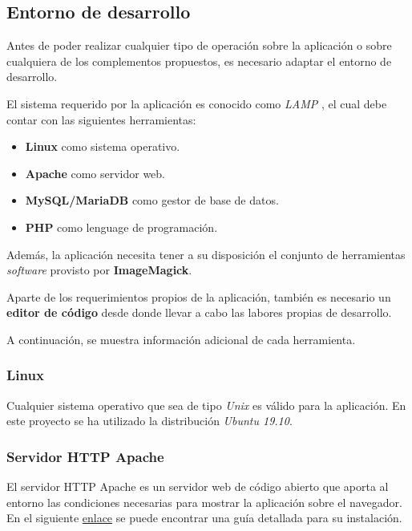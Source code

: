 \subsection{Entorno de desarrollo}

Antes de poder realizar cualquier tipo de operación sobre la aplicación
o sobre cualquiera de los complementos propuestos, es necesario adaptar
el entorno de desarrollo.

El sistema requerido por la aplicación es conocido como
\emph{LAMP} \cite{wiki:lamp} ,
el cual debe contar con las siguientes herramientas:

\begin{itemize}
\tightlist
\item
  \textbf{Linux} como sistema operativo.
\item
  \textbf{Apache} como servidor web.
\item
  \textbf{MySQL/MariaDB} como gestor de base de datos.
\item
  \textbf{PHP} como lenguage de programación.
\end{itemize}

Además, la aplicación necesita tener a su disposición el conjunto de
herramientas \emph{software} provisto por \textbf{ImageMagick}.

Aparte de los requerimientos propios de la aplicación, también es
necesario un \textbf{editor de código} desde donde llevar a cabo las
labores propias de desarrollo.

A continuación, se muestra información adicional de cada herramienta.

\subsubsection{Linux}

Cualquier sistema operativo que sea de tipo \emph{Unix} es válido para
la aplicación. En este proyecto se ha utilizado la distribución
\emph{Ubuntu 19.10}.

\subsubsection{Servidor HTTP Apache}

El servidor HTTP Apache es un servidor web de código abierto que aporta
al entorno las condiciones necesarias para mostrar la aplicación sobre
el navegador. En el siguiente
\href{http://httpd.apache.org/docs/trunk/es/install.html}{enlace} se
puede encontrar una guía detallada para su instalación.

